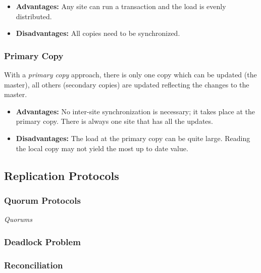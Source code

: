\begin{itemize}
\item \textbf{Advantages:} Any site can run a transaction and the load is evenly distributed.
\item \textbf{Disadvantages:} All copies need to be synchronized.
\end{itemize}




\subsubsection{Primary Copy}

With a \emph{primary copy} approach, there is only one copy which can be updated (the master), all others (secondary copies) are updated reflecting the changes to the master.


\begin{itemize}
\item \textbf{Advantages:} No inter-site synchronization is necessary; it takes place at the primary copy. There is always one site that has all the updates.
\item \textbf{Disadvantages:} The load at the primary copy can be quite large. Reading the local copy may not yield the most up to date value.
\end{itemize}




\subsection{Replication Protocols}


%


\subsubsection{Quorum Protocols}

\emph{Quorums}

\subsubsection{Deadlock Problem}

\subsubsection{Reconciliation}

\todo


